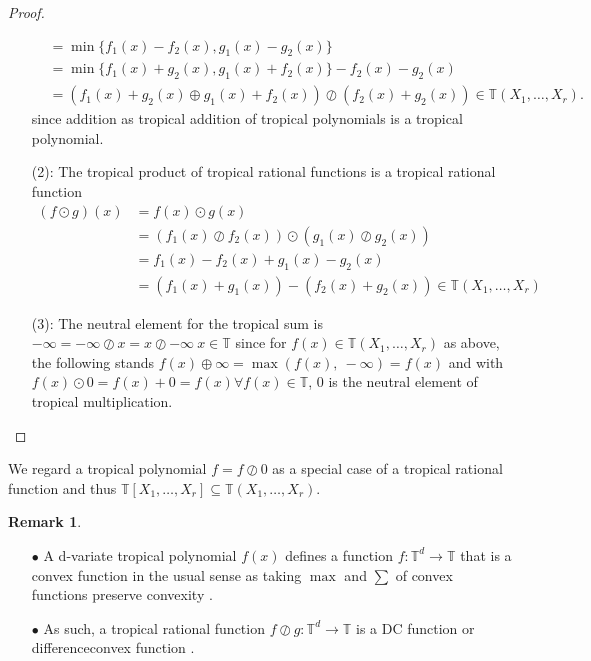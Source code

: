 \documentclass{article}
\theoremstyle{definition}
\newtheorem{remark}[theorem]{Remark}
\begin{document}
\begin{proof}
\begin{itemize}
\begin{align*}
&= \min\{f_1(x) - f_2(x), g_1(x) - g_2(x) \} \\
&= \min\{f_1(x) + g_2(x), g_1(x) + f_2(x) \} - f_2(x) - g_2(x) \\
&= (f_1(x) + g_2(x) \oplus g_1(x) + f_2(x)) \oslash (f_2(x) + g_2(x)) \in \mathbb{T}(X_1, \dots , X_r).
\end{align*}
since addition as tropical addition of tropical polynomials is a tropical polynomial.
\item[(2):]
The tropical product of tropical rational functions is a tropical rational function
\begin{align*}
(f \odot g)(x) &= f(x) \odot g(x) \\
&=  (f_1(x) \oslash f_2(x)) \odot (g_1(x) \oslash g_2(x)) \\
&= f_1(x) - f_2(x) + g_1(x) - g_2(x) \\
&= (f_1(x) + g_1(x)) - (f_2(x) + g_2(x)) \in \mathbb{T}(X_1, \dots , X_r)
\end{align*}
\item[(3):]
The neutral element for the tropical sum is $- \infty = - \infty \oslash x = x \oslash - \infty \ x \in \mathbb{T}$ since for $f(x) \in \mathbb{T}(X_1, \dots , X_r)$ as above, the following stands $ f(x) \oplus \infty = \max(f(x),\ - \infty) = f(x)$ and with $f(x) \odot 0 = f(x) + 0 = f(x) \forall f(x) \in \mathbb{T}$, $0$ is the neutral element of tropical multiplication.
\end{itemize}
\end{proof}

We regard a tropical polynomial $f=f \oslash 0$ as a special case of a tropical rational function and thus $\mathbb{T}[X_1, \dots , X_r] \subseteq \mathbb{T}(X_1, \dots , X_r)$. \cite[p.~3]{zhang2018tropical}

\begin{remark}
~\
\begin{itemize}
\item[$\bullet$]
A d-variate tropical polynomial $f(x)$ defines a function $f: \mathbb{T}^{d} \to \mathbb{T}$ that is a convex function in the usual sense as taking $\max$ and $\sum$ of convex functions preserve convexity \cite{boyd2004convex}.
\item[$\bullet$]
As such, a tropical rational function $f \oslash g : \mathbb{T}^{d} \to \mathbb{T}$ is a DC function or differenceconvex function \cite{hartman1959functions}.
\end{itemize}
\end{remark}
\end{document}
